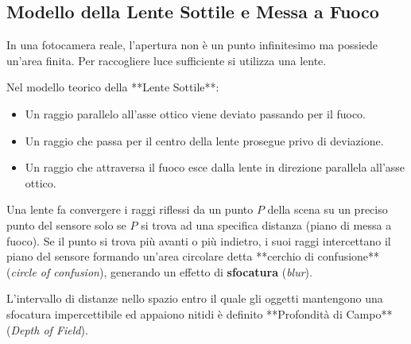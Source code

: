 \subsection{Modello della Lente Sottile e Messa a Fuoco}
In una fotocamera reale, l'apertura non è un punto infinitesimo ma possiede un'area finita. Per raccogliere luce sufficiente si utilizza una lente.

Nel modello teorico della **Lente Sottile**:
\begin{itemize}
    \item Un raggio parallelo all'asse ottico viene deviato passando per il fuoco.
    \item Un raggio che passa per il centro della lente prosegue privo di deviazione.
    \item Un raggio che attraversa il fuoco esce dalla lente in direzione parallela all'asse ottico.
\end{itemize}

Una lente fa convergere i raggi riflessi da un punto $P$ della scena su un preciso punto del sensore solo se $P$ si trova ad una specifica distanza (piano di messa a fuoco). Se il punto si trova più avanti o più indietro, i suoi raggi intercettano il piano del sensore formando un'area circolare detta **cerchio di confusione** (\textit{circle of confusion}), generando un effetto di \textbf{sfocatura} (\textit{blur}).

L'intervallo di distanze nello spazio entro il quale gli oggetti mantengono una sfocatura impercettibile ed appaiono nitidi è definito **Profondità di Campo** (\textit{Depth of Field}).

